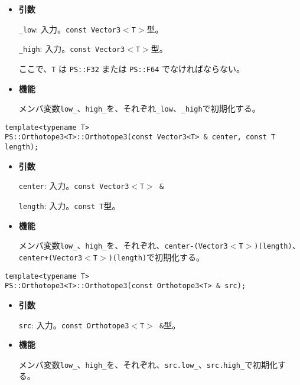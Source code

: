 \begin{itemize}

\item{{\bf 引数}}

\texttt{\_low}: 入力。\texttt{const Vector3$<$T$>$}型。

\texttt{\_high}: 入力。\texttt{const Vector3$<$T$>$}型。

ここで、\texttt{T} は \texttt{PS::F32} または \texttt{PS::F64} でなければならない。

\item{{\bf 機能}}

メンバ変数\texttt{low\_}、\texttt{high\_}を、それぞれ\texttt{\_low}、\texttt{\_high}で初期化する。

\end{itemize}
\begin{screen}
\begin{verbatim}
template<typename T>
PS::Orthotope3<T>::Orthotope3(const Vector3<T> & center, const T length);
\end{verbatim}
\end{screen}

\begin{itemize}

\item{{\bf 引数}}

\texttt{center}: 入力。\texttt{const Vector3$<$T$>$ \&}

\texttt{length}: 入力。\texttt{const T}型。

\item{{\bf 機能}}

メンバ変数\texttt{low\_}、\texttt{high\_}を、それぞれ、\texttt{center-(Vector3$<$T$>$)(length)}、\texttt{center+(Vector3$<$T$>$)(length)}で初期化する。

\end{itemize}


\begin{screen}
\begin{verbatim}
template<typename T>
PS::Orthotope3<T>::Orthotope3(const Orthotope3<T> & src);
\end{verbatim}
\end{screen}

\begin{itemize}

\item{{\bf 引数}}

\texttt{src}: 入力。\texttt{const Orthotope3$<$T$>$ \&}型。

\item{{\bf 機能}}

メンバ変数\texttt{low\_}、\texttt{high\_}を、それぞれ、\texttt{src.low\_}、\texttt{src.high\_}で初期化する。

\end{itemize}


